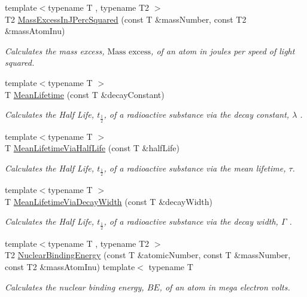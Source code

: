 \begin{DoxyCompactItemize}
{\footnotesize template$<$typename T , typename T2 $>$ }\\T2 \hyperlink{group___mass_excess_ga3eb487f438543e950b9c5aece4c5b409}{Mass\+Excess\+In\+J\+Perc\+Squared} (const T \&mass\+Number, const T2 \&mass\+Atom\+Inu)
\begin{DoxyCompactList}\small\item\em Calculates the mass excess, $\text{Mass excess}$, of an atom in joules per speed of light squared. \end{DoxyCompactList}\item 
{\footnotesize template$<$typename T $>$ }\\T \hyperlink{group___atomic_gaa9e3c2deedda4bc7a745568b06fc47eb}{Mean\+Lifetime} (const T \&decay\+Constant)
\begin{DoxyCompactList}\small\item\em Calculates the Half Life, $t_{\frac{1}{2}}$, of a radioactive substance via the decay constant, $\lambda$ . \end{DoxyCompactList}\item 
{\footnotesize template$<$typename T $>$ }\\T \hyperlink{group___atomic_ga2586e148263e1f6c8ff89f269a0930ea}{Mean\+Lifetime\+Via\+Half\+Life} (const T \&half\+Life)
\begin{DoxyCompactList}\small\item\em Calculates the Half Life, $t_{\frac{1}{2}}$, of a radioactive substance via the mean lifetime, $\tau$. \end{DoxyCompactList}\item 
{\footnotesize template$<$typename T $>$ }\\T \hyperlink{group___atomic_ga8a1dda4168b4b25db93bf1ae7832fd7e}{Mean\+Lifetime\+Via\+Decay\+Width} (const T \&decay\+Width)
\begin{DoxyCompactList}\small\item\em Calculates the Half Life, $t_{\frac{1}{2}}$, of a radioactive substance via the decay width, $\Gamma$ . \end{DoxyCompactList}\item 
{\footnotesize template$<$typename T , typename T2 $>$ }\\T2 \hyperlink{group___nuclear_binding_energy_gafea41a3c21704414394c3204b35aba98}{Nuclear\+Binding\+Energy} (const T \&atomic\+Number, const T \&mass\+Number, const T2 \&mass\+Atom\+Inu) template$<$ typename T
\begin{DoxyCompactList}\small\item\em Calculates the nuclear binding energy, $BE$, of an atom in mega electron volts. \end{DoxyCompactList}\item 

\end{DoxyCompactItemize}
